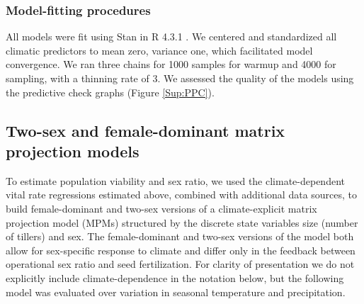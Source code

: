 \documentclass[12pt]{article}\usepackage[]{graphicx}\usepackage[dvipsnames]{xcolor}
\begin{document}
\subsubsection*{Model-fitting procedures}
All models were fit using Stan \citep{rstan} in R 4.3.1 \citep{RCoreteam}.
\noindent We centered and standardized all climatic predictors to mean zero, variance one, which facilitated model convergence.
We ran three chains for 1000 samples for warmup and 4000 for sampling, with a thinning rate of 3.
We assessed the quality of the models using the predictive check graphs \citep{piironen2017comparison} (Figure \ref{Sup:PPC}).
 

\subsection*{Two-sex and female-dominant matrix projection models}
To estimate population viability and sex ratio, we used the climate-dependent vital rate regressions estimated above, combined with additional data sources, to build female-dominant and two-sex versions of a climate-explicit matrix projection model (MPMs) structured by the discrete state variables size (number of tillers) and sex.
The female-dominant and two-sex versions of the model both allow for sex-specific response to climate and differ only in the feedback between operational sex ratio and seed fertilization. 
For clarity of presentation we do not explicitly include climate-dependence in the notation below, but the following model was evaluated over variation in seasonal temperature and precipitation. 
\end{document}
